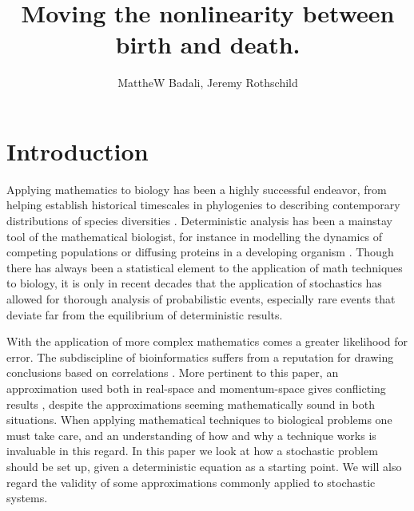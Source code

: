 \documentclass[a4paper,10pt]{article}
\title{Moving the nonlinearity between birth and death.}
\author{MattheW Badali, Jeremy Rothschild}
\numberwithin{equation}{section} %
\begin{document}
\fi


\section{Introduction} \label{Introduction}%
Applying mathematics to biology has been a highly successful endeavor, from helping establish historical timescales in phylogenies to describing contemporary distributions of species diversities \cite{Hubbell2001}. %
Deterministic analysis has been a mainstay tool of the mathematical biologist, for instance in modelling the dynamics of competing populations \cite{Chesson1990} or diffusing proteins in a developing organism \cite{Maini2004}. 
Though there has always been a statistical element to the application of math techniques to biology, it is only in recent decades that the application of stochastics has allowed for thorough analysis of probabilistic events, especially rare events that deviate far from the equilibrium of deterministic results. 

With the application of more complex mathematics comes a greater likelihood for error. 
The subdiscipline of bioinformatics suffers from a reputation for drawing conclusions based on correlations \cite{}. %
More pertinent to this paper, an approximation used both in real-space and momentum-space gives conflicting results \cite{Ovaskainen2010}, despite the approximations seeming mathematically sound in both situations. 
When applying mathematical techniques to biological problems one must take care, and an understanding of how and why a technique works is invaluable in this regard. 
In this paper we look at how a stochastic problem should be set up, given a deterministic equation as a starting point. 
We will also regard the validity of some approximations commonly applied to stochastic systems. 
\end{document}
